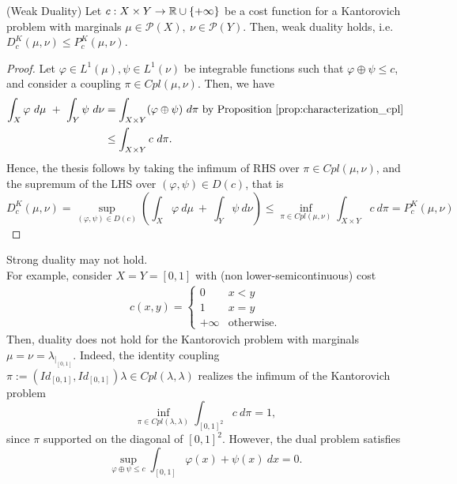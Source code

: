 \documentclass[../main.tex]{subfiles}
\begin{document}
\begin{proposition}
\label{prop:weak_duality}
    (Weak Duality) Let $c: X\times Y\to \mathbb{R}\cup\{+\infty\}$ be a cost function for a Kantorovich problem with marginals $\mu\in\mathcal{P}(X), \ \nu\in\mathcal{P}(Y)$. Then, weak duality holds, i.e. $D^K_c(\mu, \nu) \leq P^K_c(\mu, \nu)$.
\end{proposition}
\begin{proof}
    Let $\varphi\in L^1(\mu), \psi\in L^1(\nu)$ be integrable functions such that $\varphi\oplus \psi \leq c$, and consider a coupling $\pi\in Cpl(\mu, \nu)$. Then, we have
    \begin{align*}
        \int_X \varphi \ d\mu \ + \ \int_Y \psi \ d\nu 
        &= \int_{X\times Y} (\varphi \oplus \psi) \ d\pi \text{ by Proposition \ref{prop:characterization_cpl}} \\
        &\leq \int_{X\times Y} c \ d\pi.
    \end{align*}
    Hence, the thesis follows by taking the infimum of RHS over $\pi\in Cpl(\mu, \nu)$, and the supremum of the LHS over $(\varphi, \psi)\in D(c)$, that is
    $$
    D^K_c(\mu, \nu) = \sup_{(\varphi, \psi)\in D(c)} \left(\int_X \varphi \ d\mu \ + \ \int_Y \psi \ d\nu \right) 
    \leq 
    \inf_{\pi\in Cpl(\mu, \nu)} \int_{X\times Y} c \ d\pi = P^K_c(\mu, \nu)
    $$
\end{proof}

\begin{remark}
    Strong duality may not hold. \\ 
    For example, consider $X=Y=[0,1]$ with (non lower-semicontinuous) cost
    \begin{align*}
        c(x, y) = 
        \begin{cases}
            0 & x<y \\
            1 & x=y \\
            +\infty & \text{otherwise}.
        \end{cases}
    \end{align*}
    Then, duality does not hold for the Kantorovich problem with marginals $\mu=\nu=\lambda_{|_{[0,1]}}$. 
    Indeed, the identity coupling $\pi:=(Id_{[0,1]}, Id_{[0,1]})\lambda \in Cpl(\lambda, \lambda)$ realizes the infimum of the Kantorovich problem
    $$
    \inf_{\pi\in Cpl(\lambda, \lambda)} \int_{[0,1]^2} c \ d\pi = 1,
    $$
    since $\pi$ supported on the diagonal of $[0,1]^2$. However, the dual problem satisfies
    $$
    \sup_{\varphi\oplus\psi \leq c} \int_{[0,1]} \varphi(x)+\psi(x) \ dx = 0.
    $$
\end{remark}
\end{document}
